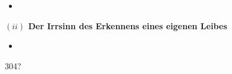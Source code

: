 \documentclass[a4paper, 12pt]{article}
\begin{document}
\begin{onehalfspace}

\begin{itemize}
  \item 
\end{itemize}


\vspace{5mm}
\noindent\textbf{$(ii)$ Der Irrsinn des Erkennens eines eigenen Leibes}



\begin{itemize}
  \item 
\end{itemize}




304? 


\end{onehalfspace}
\end{document}
